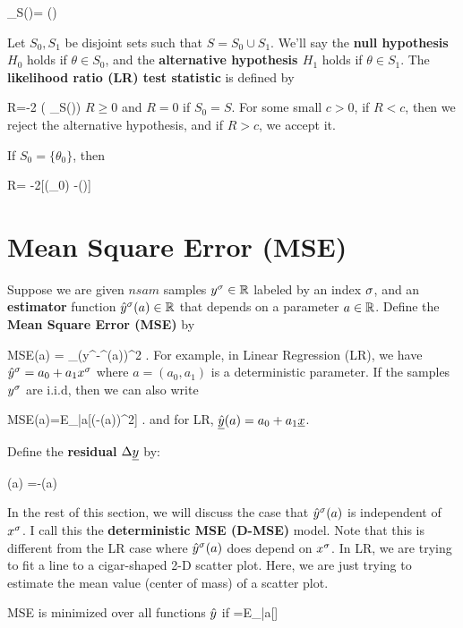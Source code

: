 \beq
\sup_{\theta\in S}\call(\theta)=
\call(\hat{\theta})
\eeq


Let $S_0, S_1$ be disjoint sets such that
 $S=S_0\cup S_1$.
We'll say
the {\bf null hypothesis $H_0$} holds
 if $\theta\in S_0$,
and the {\bf alternative hypothesis $H_1$}
holds if 
$\theta\in S_1$.
The {\bf likelihood ratio (LR) test statistic}
is defined by


\beq
R=-2\ln 
\left(
{\sup_{\theta\in S}\call(\theta)}\right)
\eeq
$R\geq 0$ and $R=0$ if  $S_0=S$.
For some small $c>0$,  
if $R<c$, then we reject the alternative hypothesis, 
and if $R>c$, we accept it.




If $S_0=\{\theta_0\}$,
then

\beq
R= -2[\ln \call(\theta_0) -\ln \call(\hat{\theta})]
\eeq



\section{Mean Square Error (MSE)}

Suppose we are 
given $nsam$ samples $y^\sigma\in{ \mathbb{R}}$
labeled by an index $\sigma$,
and an {\bf estimator} function ${\hat{y}}^\sigma(a)\in{ \mathbb{R}}$ 
that depends on a parameter $a\in{ \mathbb{R}}$.
Define the {\bf Mean Square
Error (MSE)}
by

\beq
MSE(a) = \sum_\s (y^\s-\haty^\s(a))^2
\;.
\eeq
For example, in Linear Regression (LR),
we have ${\hat{y}}^\sigma= a_0 + a_1 x^\sigma$
where $a=(a_0, a_1)$ is a deterministic
parameter.
If the samples $y^\sigma$
are i.i.d, 
then we can also write


\beq 
MSE(a)=E_{|a}[(\rvy-\ul{\haty}(a))^2]
\;.
\eeq
and for LR, $\underline{{\hat{y}}}(a)=a_0+a_1{\underline{x}}$.

Define the {\bf residual} $\Delta{\underline{y}}$ by:


\beq
\Delta\rvy(a) =\rvy-\ul{\haty}(a)
\;\;\;
\eeq

In the rest of this section,
we will discuss the case that
${\hat{y}}^\sigma(a)$ is independent of $x^\sigma$.
I call
this the {\bf deterministic MSE (D-MSE)}
model.
Note that this
is different from the LR
case where
${\hat{y}}^\sigma(a)$ does depend on $x^\sigma$. 
In LR, we are trying
to fit 
a line to a cigar-shaped
2-D scatter plot.
Here, we are just trying
to estimate
the mean value (center of mass)
of a scatter plot.


\begin{claim}
MSE is minimized 
over all functions ${\hat{y}}$ if
\beq
\haty =E_{|a}[\rvy]
\eeq
\end{claim}
\proof

